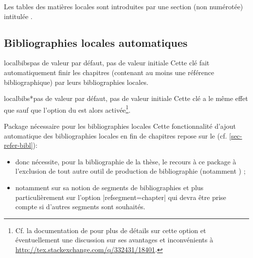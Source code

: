 Les tables des matières locales sont introduites par une section (non numérotée)
intitulée .

\subsection{Bibliographies locales automatiques}
\label{sec-localbibs}%
%

%
%

\begin{docKey}[][doc new=2016-10-30]{localbibs}{}{pas de valeur par défaut, pas
    de valeur initiale}
  Cette clé fait automatiquement finir les chapitres (contenant au moins une
  référence bibliographique) par leurs bibliographies locales.
\end{docKey}

\begin{docKey}[][doc new=2016-10-30]{localbibs*}{}{pas de valeur par défaut, pas
    de valeur initiale}
  Cette clé a le même effet que  sauf que l'option
   du  est alors
  activée\footnote{Cf. la documentation de  pour plus de
    détails sur cette option et éventuellement une discussion sur ses avantages
    et inconvénients à \url{http://tex.stackexchange.com/q/332431/18401}.}.
\end{docKey}

\begin{dbwarning}{Package  nécessaire pour les bibliographies
    locales}{}
  Cette fonctionnalité d'ajout automatique des bibliographies locales en fin de
  chapitres repose sur le  (cf. \vref{sec-refer-bibl}):
  \begin{itemize}
  \item donc nécessite, pour la bibliographie de la thèse, le recours à ce
    package \alert{à l'exclusion de tout autre outil de production de
      bibliographie} (notamment ) ;
  \item notamment sur sa notion de segments de bibliographies et plus
    particulièrement sur l'option |refsegment=chapter| qui devra être prise
    compte si d'autres segments sont souhaités.
  \end{itemize}
\end{dbwarning}

